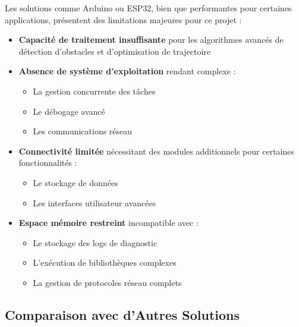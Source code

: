 \documentclass[a4paper, 12pt]{article}
\begin{document}
	Les solutions comme Arduino ou ESP32, bien que performantes pour certaines applications, présentent des limitations majeures pour ce projet :
	
	\begin{itemize}
		\item \textbf{Capacité de traitement insuffisante} pour les algorithmes avancés de détection d'obstacles et d'optimisation de trajectoire
		
		\item \textbf{Absence de système d'exploitation} rendant complexe :
		\begin{itemize}
			\item La gestion concurrente des tâches
			\item Le débogage avancé
			\item Les communications réseau
		\end{itemize}
		
		\item \textbf{Connectivité limitée} nécessitant des modules additionnels pour certaines fonctionnalités :
		\begin{itemize}
			\item Le stockage de données
			\item Les interfaces utilisateur avancées
		\end{itemize}
		
		\item \textbf{Espace mémoire restreint} incompatible avec :
		\begin{itemize}
			\item Le stockage des logs de diagnostic
			\item L'exécution de bibliothèques complexes
			\item La gestion de protocoles réseau complets
		\end{itemize}
	\end{itemize}
	
	\subsection{Comparaison avec d'Autres Solutions}
	
\end{document}
